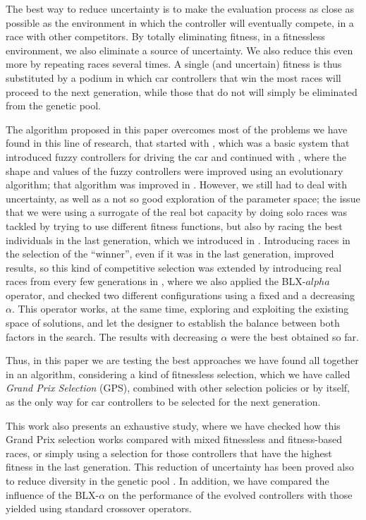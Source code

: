 \documentclass[10pt,journal,compsoc]{IEEEtran}
\begin{document}
The best way to reduce uncertainty is to make the evaluation process
as close as possible as the environment in which the controller will
eventually compete, in a race with other competitors. By totally
eliminating fitness, in a fitnessless environment, we also eliminate
a source of uncertainty. We also reduce this even more by repeating
races several times. A single (and uncertain) fitness is thus
substituted by a podium in which car controllers that win the most
races will proceed to the next generation, while those that do not
will simply be eliminated from the genetic pool. 

The algorithm proposed in this paper overcomes most of the problems we
have found in this line of research, that started with
\cite{DBLP:conf/evoW/SalemMMG17}, which was a basic system that
introduced fuzzy controllers for driving the car and continued with
\cite{10.1007/978-3-319-77538-8_24}, where the shape and values of the
fuzzy controllers were improved using an evolutionary algorithm; that
algorithm was improved in \cite{DBLP:conf/ipmu/SalemMGG18}. However,
we still had to deal with uncertainty, as well as a not so good
exploration of the parameter space; the issue that we were using a
surrogate of the real bot capacity by doing solo races was tackled by
trying to use different fitness functions, but also by racing the best
individuals in the last generation, which we introduced in
\cite{salem_cig2018}. Introducing races in the selection of the
``winner'', even if it was in the last generation, improved results,
so this kind of competitive selection was extended by introducing real
races from every few generations in 
\cite{DBLP:conf/cig/SalemMG19}, where we also applied the BLX-$alpha$ operator, and checked two different configurations using a fixed and a decreasing $\alpha$. This operator works, at the same time, exploring and exploiting the existing space of solutions, and let the designer to establish the balance between both factors in the search. The results with decreasing $\alpha$ were the best obtained so far.

Thus, in this paper we are testing the best approaches we have found all together in an algorithm, considering a kind of fitnessless selection, which we have called \textit{Grand Prix Selection} (GPS), combined with other selection policies or by itself, as the only way for car controllers to be selected for the next generation.

This work also presents an exhaustive study, where we have checked how this Grand Prix selection works compared with mixed fitnessless and fitness-based races, or simply using a selection for those controllers that have the highest fitness in the last generation.  This reduction of uncertainty has been proved also to reduce diversity in the genetic pool
\cite{DBLP:journals/tcci/MereloLFGCCRMGTCC16}. 
In addition, we have compared the influence of the BLX-$\alpha$ on the performance of the evolved controllers with those yielded using standard crossover operators.
\end{document}
